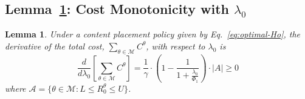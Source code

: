 \documentclass[10pt,conference,letterpaper]{IEEEtran}
\newtheorem{lemma}{Lemma}
\newcommand{\eq}[1]{Eq.~\eqref{#1}}
\begin{document}
\subsection{Lemma~\ref{thm:monotonicity}: Cost Monotonicity with $\lambda_{0}$}\label{appendix:lemma-monotonicity}
\begin{lemma}\label{thm:monotonicity}
Under a content placement policy given by \eq{eq:optimal-Ho}, the derivative of the total cost, $\sum_{\theta\in\mathcal{M}}C^{\theta}$, with respect to $\lambda_{0}$ is
\begin{equation*}\label{eq:derivative-cost-final}
\frac{d}{d\lambda_{0}}\left[ \sum_{\theta\in\mathcal{M}}C^{\theta}\right] = \frac{1}{\gamma}\cdot\left(1-\frac{1}{1+\frac{\lambda_{0}}{\Phi_{1}}}\right)\cdot |A|	\geq 0
\end{equation*}
where $\mathcal{A} = \lbrace\theta\in\mathcal{M}:L\leq R_{0}^{\theta}\leq U\rbrace$.
\end{lemma}
\end{document}
